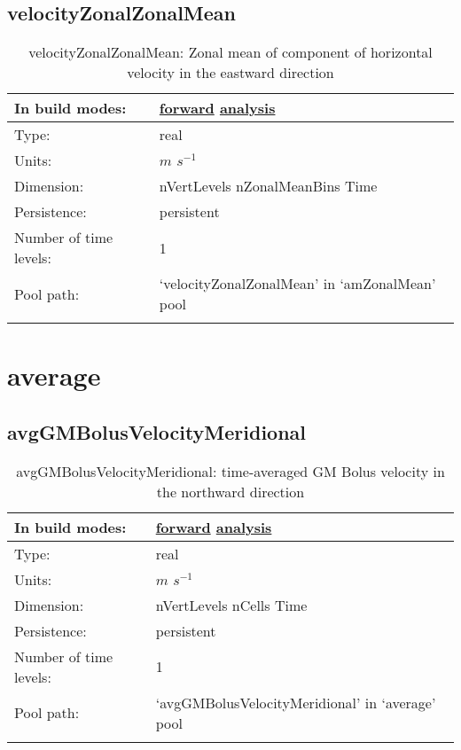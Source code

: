 \subsection[velocityZonalZonalMean]{velocityZonalZonalMean}
\label{subsec:var_sec_amZonalMean_velocityZonalZonalMean}
\begin{center}
\begin{longtable}{| p{2.0in} | p{4.0in} |}
        \hline 
        In build modes: & \hyperref[subsec:forward_var_tab_amZonalMean]{forward} \hyperref[subsec:analysis_var_tab_amZonalMean]{analysis} \\
        \hline 
        Type: & real \\
        \hline 
        Units: & $m$ $s^{-1}$ \\
        \hline 
        Dimension: & nVertLevels nZonalMeanBins Time \\
        \hline 
        Persistence: & persistent \\
        \hline 
        Number of time levels: & 1 \\
        \hline 
            Pool path: & `velocityZonalZonalMean' in `amZonalMean' pool \\
		 \hline 
    \caption{velocityZonalZonalMean: Zonal mean of component of horizontal velocity in the eastward direction}
\end{longtable}
\end{center}
\section[average]{average}
\label{sec:var_sec_average}
\subsection[avgGMBolusVelocityMeridional]{avgGMBolusVelocityMeridional}
\label{subsec:var_sec_average_avgGMBolusVelocityMeridional}
\begin{center}
\begin{longtable}{| p{2.0in} | p{4.0in} |}
        \hline 
        In build modes: & \hyperref[subsec:forward_var_tab_average]{forward} \hyperref[subsec:analysis_var_tab_average]{analysis} \\
        \hline 
        Type: & real \\
        \hline 
        Units: & $m$ $s^{-1}$ \\
        \hline 
        Dimension: & nVertLevels nCells Time \\
        \hline 
        Persistence: & persistent \\
        \hline 
        Number of time levels: & 1 \\
        \hline 
            Pool path: & `avgGMBolusVelocityMeridional' in `average' pool \\
		 \hline 
    \caption{avgGMBolusVelocityMeridional: time-averaged GM Bolus velocity in the northward direction}
\end{longtable}
\end{center}
